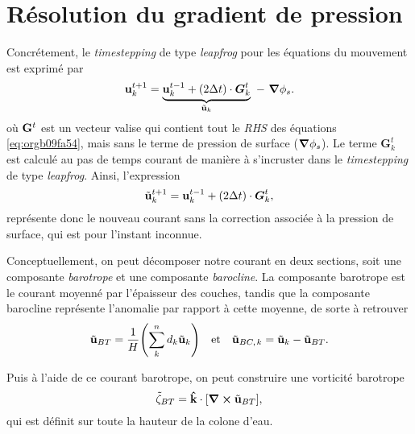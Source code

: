 \documentclass[10pt]{report}
\numberwithin{equation}{section}
\newcommand{\kvf}{\vb{\hat{k}}}
\newcommand{\uu}{\vb{u}}
\newcommand{\pt}{\hspace{1pt}} %
\begin{document}
\section{Résolution du gradient de pression}
\label{sec:org45e48a3}
\label{orgd51a1f2}

Concrétement, le \emph{timestepping} de type \emph{leapfrog} pour les équations du mouvement est exprimé par
\begin{equation}
\label{eq:orgcf09761}
 \uu^{t+1}_k = \underbrace{ \uu^{t-1}_k + (2\Delta t)\cdot \vb*{G}^t_k}_{\tilde{\uu}_k} \ -\ \gradient{\phi_s}.
\end{equation}
où \(\vb{G}^t\) est un vecteur valise qui contient tout le \emph{RHS} des équations \ref{eq:orgb09fa54}, mais sans le terme de pression de surface (\(\gradient{\phi_s}\)).
Le terme \(\boldsymbol{G}_k^t\) est calculé au pas de temps courant de manière à s'incruster dans le \emph{timestepping} de type \emph{leapfrog}.
Ainsi, l'expression
\begin{equation}
   \tilde{\uu}^{t+1}_k = \uu^{t-1}_k + (2\Delta t)\cdot \vb*{G}^t_k,
\end{equation}
représente donc le nouveau courant sans la correction associée à la pression de surface, qui est pour l'instant inconnue.\bigskip


Conceptuellement, on peut décomposer notre courant en deux sections, soit une composante \emph{barotrope} et une composante \emph{barocline}.
La composante barotrope est le courant moyenné par l'épaisseur des couches, tandis que la composante barocline représente l'anomalie par rapport à cette moyenne, de sorte à retrouver
\begin{subequations}
\begin{align}
 && \tilde{\uu}_{BT} = \frac{1}{H} \qty(\sum_k^n d_k \tilde{\uu}_k) && \text{et}
 && \tilde{\uu}_{BC,\pt k} = \tilde{\uu}_k - \tilde{\uu}_{BT}. &&
\end{align}
\end{subequations}

Puis à l'aide de ce courant barotrope, on peut construire une vorticité barotrope
\begin{equation}
 \tilde{\zeta}_{BT} = \kvf \cdot \qty[\curl{\tilde{\uu}_{BT}}],
\end{equation}
qui est définit sur toute la hauteur de la colone d'eau.\bigskip
\end{document}
